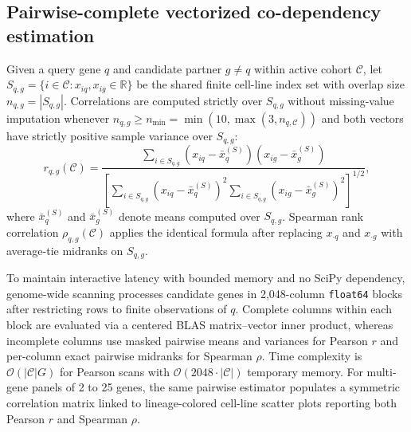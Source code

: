 \documentclass[11pt,a4paper]{article}
\begin{document}
\subsection{Pairwise-complete vectorized co-dependency estimation}
Given a query gene $q$ and candidate partner $g \neq q$ within active cohort $\mathcal{C}$, let $S_{q,g} = \{i \in \mathcal{C} : x_{iq}, x_{ig} \in \mathbb{R}\}$ be the shared finite cell-line index set with overlap size $n_{q,g} = |S_{q,g}|$. Correlations are computed strictly over $S_{q,g}$ without missing-value imputation whenever $n_{q,g} \ge n_{\min} = \min(10, \max(3, n_{q,\mathcal{C}}))$ and both vectors have strictly positive sample variance over $S_{q,g}$:
\begin{equation}
r_{q,g}(\mathcal{C}) = \frac{\sum_{i \in S_{q,g}} \left(x_{iq} - \bar{x}_q^{(S)}\right)\left(x_{ig} - \bar{x}_g^{(S)}\right)}{\left[\sum_{i \in S_{q,g}} \left(x_{iq} - \bar{x}_q^{(S)}\right)^2 \sum_{i \in S_{q,g}} \left(x_{ig} - \bar{x}_g^{(S)}\right)^2\right]^{1/2}},
\end{equation}
where $\bar{x}_q^{(S)}$ and $\bar{x}_g^{(S)}$ denote means computed over $S_{q,g}$. Spearman rank correlation $\rho_{q,g}(\mathcal{C})$ applies the identical formula after replacing $x_{\cdot q}$ and $x_{\cdot g}$ with average-tie midranks on $S_{q,g}$.

To maintain interactive latency with bounded memory and no SciPy dependency, genome-wide scanning processes candidate genes in 2,048-column \texttt{float64} blocks after restricting rows to finite observations of $q$. Complete columns within each block are evaluated via a centered BLAS matrix--vector inner product, whereas incomplete columns use masked pairwise means and variances for Pearson $r$ and per-column exact pairwise midranks for Spearman $\rho$. Time complexity is $\mathcal{O}(|\mathcal{C}| G)$ for Pearson scans with $\mathcal{O}(2048 \cdot |\mathcal{C}|)$ temporary memory. For multi-gene panels of 2 to 25 genes, the same pairwise estimator populates a symmetric correlation matrix linked to lineage-colored cell-line scatter plots reporting both Pearson $r$ and Spearman $\rho$.
\end{document}
